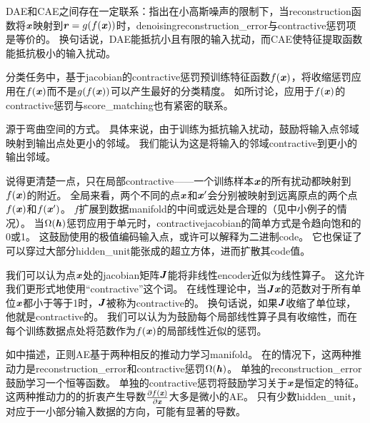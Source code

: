 \gls{DAE}和\gls{CAE}之间存在一定联系：\citet{Alain+Bengio-ICLR2013-small}指出在小高斯噪声的限制下，当\gls{reconstruction}函数将$\boldsymbol{\mathit{x}}$映射到$\boldsymbol{\mathit{r}} = g(f(\boldsymbol{\mathit{x}}))$时，\gls{denoising}\gls{reconstruction_error}与\gls{contractive}惩罚项是等价的。
换句话说，\gls{DAE}能抵抗小且有限的输入扰动，而\gls{CAE}使特征提取函数能抵抗极小的输入扰动。

分类任务中，基于\gls{jacobian}的\gls{contractive}惩罚预训练特征函数$f(\boldsymbol{\mathit{x}})$，将收缩惩罚应用在$f(\boldsymbol{\mathit{x}})$而不是$g(f(\boldsymbol{\mathit{x}}))$可以产生最好的分类精度。
如所讨论，应用于$f(\boldsymbol{\mathit{x}})$的\gls{contractive}惩罚与\gls{score_matching}也有紧密的联系。

源于弯曲空间的方式。
具体来说，由于训练为抵抗输入扰动，鼓励将输入点邻域映射到输出点处更小的邻域。
我们能认为这是将输入的邻域\gls{contractive}到更小的输出邻域。


说得更清楚一点，只在局部\gls{contractive}——一个训练样本$\boldsymbol{\mathit{x}}$的所有扰动都映射到$f(\boldsymbol{\mathit{x}})$的附近。
全局来看，两个不同的点$\boldsymbol{\mathit{x}}$和$\boldsymbol{\mathit{x}}'$会分别被映射到远离原点的两个点$f(\boldsymbol{\mathit{x}})$和$f(\boldsymbol{\mathit{x}}')$。
$f$扩展到数据\gls{manifold}的中间或远处是合理的（见中小例子的情况）。
当$\Omega(\boldsymbol{\mathit{h}})$惩罚应用于单元时，\gls{contractive}\gls{jacobian}的简单方式是令趋向饱和的0或1。
这鼓励使用的极值编码输入点，或许可以解释为二进制\gls{code}。
它也保证了可以穿过大部分\gls{hidden_unit}能张成的超立方体，进而扩散其\gls{code}值。

我们可以认为点$\boldsymbol{\mathit{x}}$处的\gls{jacobian}矩阵$\boldsymbol{\mathit{J}}$能将非线性\gls{encoder}近似为线性算子。
这允许我们更形式地使用``\gls{contractive}''这个词。
在线性理论中，当$\boldsymbol{\mathit{J}}\boldsymbol{\mathit{x}}$的范数对于所有单位$\boldsymbol{\mathit{x}}$都小于等于1时，$\boldsymbol{\mathit{J}}$被称为\gls{contractive}的。
换句话说，如果$\boldsymbol{\mathit{J}}$收缩了单位球，他就是\gls{contractive}的。
我们可以认为为鼓励每个局部线性算子具有收缩性，而在每个训练数据点处将范数作为$f(\boldsymbol{\mathit{x}})$的局部线性近似的惩罚。


如中描述，正则\gls{AE}基于两种相反的推动力学习\gls{manifold}。
在的情况下，这两种推动力是\gls{reconstruction_error}和\gls{contractive}惩罚$\Omega(\boldsymbol{\mathit{h}})$。
单独的\gls{reconstruction_error}鼓励学习一个恒等函数。
单独的\gls{contractive}惩罚将鼓励学习关于$\boldsymbol{\mathit{x}}$是恒定的特征。
这两种推动力的的折衷产生导数$\frac{\partial f(\boldsymbol{\mathit{x}})}{\partial \boldsymbol{\mathit{x}}}$大多是微小的\gls{AE}。
只有少数\gls{hidden_unit}，对应于一小部分输入数据的方向，可能有显著的导数。


